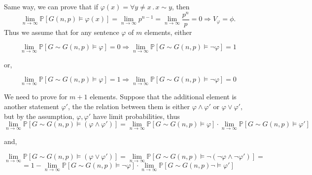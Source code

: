 \documentclass{article}
\begin{document}
Same way, we can prove that if $\varphi(x)=\forall{y\neq{x}}\,.\,x\sim{y}$, then \[\lim_{n\rightarrow\infty}\mathbb{P}[G(n,p)\vDash\varphi(x)]=\lim_{n\rightarrow\infty}p^{n-1}=\lim_{n\rightarrow\infty}\frac{p^n}{p}=0\Rightarrow{V_\varphi=\phi}.\]
Thus we assume that for any sentence $\varphi$ of $m$ elements, either

\[\lim_{n\rightarrow\infty}\mathbb{P}[G\sim{G(n,p)\vDash\varphi}]=0\Rightarrow\lim_{n\rightarrow\infty}\mathbb{P}[G\sim{G(n,p)\vDash\neg\varphi}]=1\]

or,

\[\lim_{n\rightarrow\infty}\mathbb{P}[G\sim{G(n,p)\vDash\varphi}]=1\Rightarrow\lim_{n\rightarrow\infty}\mathbb{P}[G\sim{G(n,p)\vDash\neg\varphi}]=0\]

We need to prove for $m+1$ elements. Suppose that the additional element is another statement $\varphi'$, the the relation between them is either $\varphi\land\varphi'$ or $\varphi\lor\varphi'$, but by the assumption, $\varphi,\varphi'$ have limit probabilities, thus \[\lim_{n\rightarrow\infty
}\mathbb{P}[G\sim{G(n,p)}\vDash(\varphi\land\varphi')]=\lim_{n\rightarrow\infty
}\mathbb{P}[G\sim{G(n,p)}\vDash\varphi]\cdot\lim_{n\rightarrow\infty
}\mathbb{P}[G\sim{G(n,p)}\vDash\varphi']\]

and,

\[\lim_{n\rightarrow\infty
}\mathbb{P}[G\sim{G(n,p)}\vDash(\varphi\lor\varphi')]=\lim_{n\rightarrow\infty
}\mathbb{P}[G\sim{G(n,p)}\vDash\neg(\neg\varphi\land\neg\varphi')]=\]\[=1-\lim_{n\rightarrow\infty
}\mathbb{P}[G\sim{G(n,p)}\vDash\neg\varphi]\cdot\lim_{n\rightarrow\infty
}\mathbb{P}[G\sim{G(n,p)}\neg\vDash\varphi']\]
\end{document}
